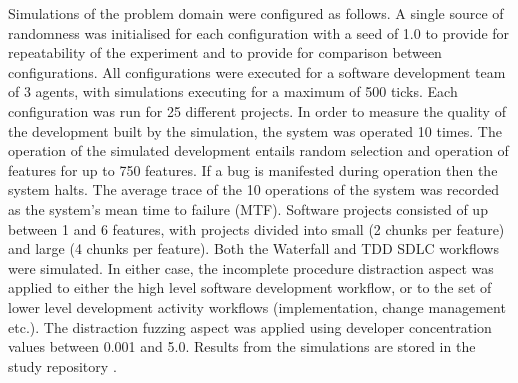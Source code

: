 \documentclass{llncs}
\begin{document}
Simulations of the problem domain were configured as follows.  A single source of randomness was initialised for each
configuration with a seed of 1.0 to provide for repeatability of the experiment and to provide for comparison between
configurations. All configurations were executed for a software development team of 3 agents, with simulations executing
for a maximum of 500 ticks.  Each configuration was run for 25 different projects.  In order to measure the quality of
the development built by the simulation, the system was operated 10 times.  The operation of the simulated development
entails random selection and operation of features for up to 750 features.  If a bug is manifested during operation then
the system halts.  The average trace of the 10 operations of the system was recorded as the system's mean time to
failure (MTF). Software projects consisted of up between 1 and 6 features, with projects divided into small (2 chunks
per feature) and large (4 chunks per feature). Both the Waterfall and TDD SDLC workflows were simulated.  In either
case, the incomplete procedure distraction aspect was applied to either the high level software development workflow, or
to the set of lower level development activity workflows (implementation, change management etc.).  The distraction
fuzzing aspect was applied using developer concentration values between 0.001 and 5.0.  Results from the simulations are
stored in the study repository \citep{storer2016softdev-workflow-scm}.



\end{document}
